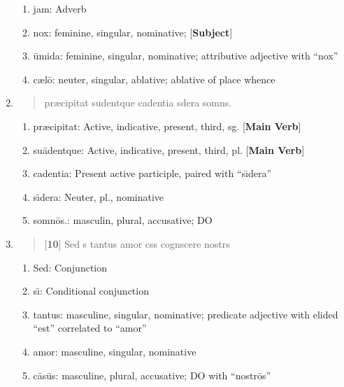 \documentclass[]{article}
\newcommand{\latify}[1]{
        \Large
        \begin{verse}
          \begin{metrica}
          {#1}\\
          \end{metrica}
        \end{verse}
        \normalsize
}
\begin{document}
\begin{enumerate}
\begin{enumerate}
	\item jam:  Adverb

	\item nox:  feminine, singular, nominative; [\textbf{Subject}]

	\item \={u}mida:  feminine, singular, nominative; attributive adjective with ``nox''

	\item c{\ae}l\={o}:  neuter, singular, ablative; ablative of place whence
\end{enumerate}


\item \latify{pr{\ae}cipitat su{}dentque cadentia s{\macron {\i}}dera somn{\macron {o}}s.}         

\begin{enumerate}

	\item pr{\ae}cipitat:    Active, indicative, present, third, sg. [\textbf{Main Verb}]

	\item su\={a}dentque:     Active, indicative, present, third, pl. [\textbf{Main Verb}]

	\item cadentia:  Present active participle, paired with ``s\={\i}dera''

	\item s\={\i}dera:  Neuter, pl., nominative

	\item somn\={o}s.: masculin, plural, accusative; DO

\end{enumerate}

\item \latify{[\textbf{10}] Sed s{\macron {\i}} tantus amor c{\macron {a}}s{\macron {u}}s cogn{\macron {o}}scere nostr{\macron {o}}s }
\begin{enumerate}

	\item Sed:  Conjunction

	\item s\={\i}:  Conditional conjunction

	\item tantus: masculine, singular, nominative; predicate adjective with elided ``est'' correlated to ``amor''

	\item amor:  masculine, singular, nominative

	\item c\={a}s\={u}s: masculine, plural, accusative; DO with ``nostr\={o}s''


\end{enumerate}
\end{enumerate}
\end{document}
